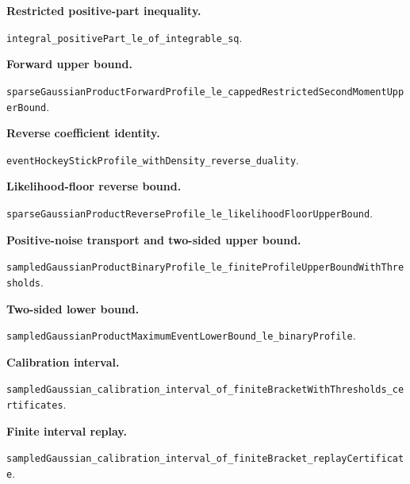 \documentclass[11pt]{article}
\theoremstyle{remark}
\begin{document}
\textbf{Restricted positive-part inequality.}\par
\nolinkurl{integral_positivePart_le_of_integrable_sq}.

\textbf{Forward upper bound.}\par
\nolinkurl{sparseGaussianProductForwardProfile_le_cappedRestrictedSecondMomentUpperBound}.

\textbf{Reverse coefficient identity.}\par
\nolinkurl{eventHockeyStickProfile_withDensity_reverse_duality}.

\textbf{Likelihood-floor reverse bound.}\par
\nolinkurl{sparseGaussianProductReverseProfile_le_likelihoodFloorUpperBound}.

\textbf{Positive-noise transport and two-sided upper bound.}\par
\nolinkurl{sampledGaussianProductBinaryProfile_le_finiteProfileUpperBoundWithThresholds}.

\textbf{Two-sided lower bound.}\par
\nolinkurl{sampledGaussianProductMaximumEventLowerBound_le_binaryProfile}.

\textbf{Calibration interval.}\par
\nolinkurl{sampledGaussian_calibration_interval_of_finiteBracketWithThresholds_certificates}.

\textbf{Finite interval replay.}\par
\nolinkurl{sampledGaussian_calibration_interval_of_finiteBracket_replayCertificate}.

\endgroup
\end{document}
